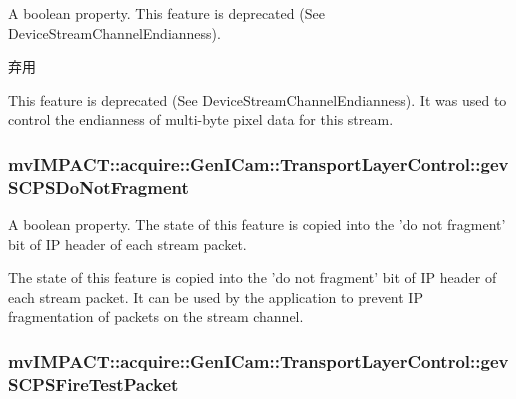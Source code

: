 A boolean property. This feature is deprecated (See Device\+Stream\+Channel\+Endianness). 

\begin{DoxyRefDesc}{弃用}
\item[\hyperlink{deprecated__deprecated000085}{弃用}]This feature is deprecated (See Device\+Stream\+Channel\+Endianness). It was used to control the endianness of multi-\/byte pixel data for this stream. \end{DoxyRefDesc}
\hypertarget{classmv_i_m_p_a_c_t_1_1acquire_1_1_gen_i_cam_1_1_transport_layer_control_a71bd765c9c0152bc2fd66ddc0466db79}{
\subsubsection[{gev\+S\+C\+P\+S\+Do\+Not\+Fragment}]{ mv\+I\+M\+P\+A\+C\+T\+::acquire\+::\+Gen\+I\+Cam\+::\+Transport\+Layer\+Control\+::gev\+S\+C\+P\+S\+Do\+Not\+Fragment}}\label{classmv_i_m_p_a_c_t_1_1acquire_1_1_gen_i_cam_1_1_transport_layer_control_a71bd765c9c0152bc2fd66ddc0466db79}


A boolean property. The state of this feature is copied into the 'do not fragment' bit of I\+P header of each stream packet. 

The state of this feature is copied into the 'do not fragment' bit of I\+P header of each stream packet. It can be used by the application to prevent I\+P fragmentation of packets on the stream channel. \hypertarget{classmv_i_m_p_a_c_t_1_1acquire_1_1_gen_i_cam_1_1_transport_layer_control_a8a5d17d229de12e2dce323c425809af8}{
\subsubsection[{gev\+S\+C\+P\+S\+Fire\+Test\+Packet}]{ mv\+I\+M\+P\+A\+C\+T\+::acquire\+::\+Gen\+I\+Cam\+::\+Transport\+Layer\+Control\+::gev\+S\+C\+P\+S\+Fire\+Test\+Packet}}\label{classmv_i_m_p_a_c_t_1_1acquire_1_1_gen_i_cam_1_1_transport_layer_control_a8a5d17d229de12e2dce323c425809af8}


